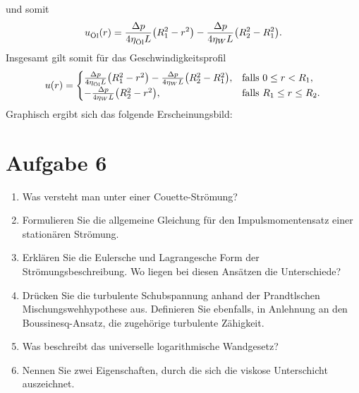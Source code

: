 \documentclass{exercise}
\begin{document}
\begin{enumerate}
\[        \]
        und somit
        \[
            u_{\text{Öl}}\parentheses*{r} = \frac{\Delta p}{4\eta_{\text{Öl}}L}\parentheses*{R_1^2 - r^2} - \frac{\Delta p}{4\eta_W L}\parentheses*{R_2^2 - R_1^2}.
        \]
        Insgesamt gilt somit für das Geschwindigkeitsprofil
        \[
            u\parentheses*{r} = \begin{cases}
                \frac{\Delta p}{4\eta_{\text{Öl}}L}\parentheses*{R_1^2 - r^2} - \frac{\Delta p}{4\eta_W L}\parentheses*{R_2^2 - R_1^2}, & \text{falls }0 \le r < R_1,\\
                -\frac{\Delta p}{4\eta_W L}\parentheses*{R_2^2 - r^2}, & \text{falls }R_1 \le r \le R_2.
            \end{cases}
        \]
        Graphisch ergibt sich das folgende Erscheinungsbild:
        \begin{center}
        \end{center}
    \end{enumerate}


    \section*{Aufgabe 6}
    
    \begin{problem}
        \begin{enumerate}
            \item Was versteht man unter einer Couette-Strömung?
            \item Formulieren Sie die allgemeine Gleichung für den Impulsmomentensatz einer stationären Strömung.
            \item Erklären Sie die Eulersche und Lagrangesche Form der Strömungsbeschreibung.
            Wo liegen bei diesen Ansätzen die Unterschiede?
            \item Drücken Sie die turbulente Schubspannung anhand der Prandtlschen Mischungswehhypothese aus.
            Definieren Sie ebenfalls, in Anlehnung an den Boussinesq-Ansatz, die zugehörige turbulente Zähigkeit.
            \item Was beschreibt das universelle logarithmische Wandgesetz?
            \item Nennen Sie zwei Eigenschaften, durch die sich die viskose Unterschicht auszeichnet.
        \end{enumerate}
    \end{problem}
    
\end{document}
